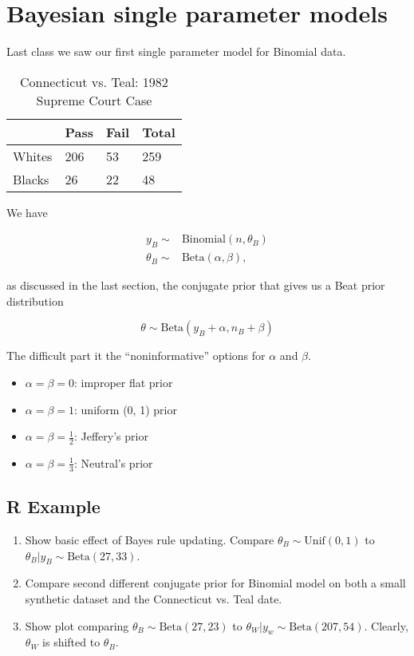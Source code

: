 \section{Bayesian single parameter models}

Last class we saw our first single parameter model for Binomial data.

\begin{table}[ht]
\centering
\begin{tabular}{@{}llll@{}}
\toprule
       & Pass & Fail & Total \\ \midrule
Whites & 206  & 53   & 259   \\
Blacks & 26   & 22   & 48    \\ \bottomrule
\end{tabular}
\caption{Connecticut vs. Teal: 1982 Supreme Court Case}
\end{table}

We have

\begin{align*}
    y_B \sim& \text{Binomial}(n, \theta_B)\\
    \theta_B \sim& \text{Beta}(\alpha, \beta),
\end{align*}

as discussed in the last section, the conjugate prior that gives us a Beat prior distribution 

\[
\theta \sim \text{Beta}(y_B + \alpha, n_B + \beta)
\]

The difficult part it the ``noninformative'' options for $\alpha$ and $\beta$.

\begin{itemize}
    \item $\alpha = \beta = 0$: improper flat prior
    \item $\alpha = \beta = 1$: uniform (0, 1) prior
    \item $\alpha = \beta = \frac{1}{2}$: Jeffery's prior
    \item $\alpha = \beta = \frac{1}{3}$: Neutral's prior
\end{itemize}

\subsection{R Example}
\begin{enumerate}
    \item Show basic effect of Bayes rule updating. Compare $\theta_B \sim \text{Unif}(0, 1)$ to $\theta_B | y_B \sim \text{Beta}(27, 33)$.
    \item Compare second different conjugate prior for Binomial model on both a small synthetic dataset and the Connecticut vs. Teal date.
    \item Show plot comparing $\theta_B \sim \text{Beta}(27, 23)$ to $\theta_W| y_w \sim \text{Beta}(207, 54)$. Clearly, $\theta_W$ is shifted to $\theta_B$.
\end{enumerate}

